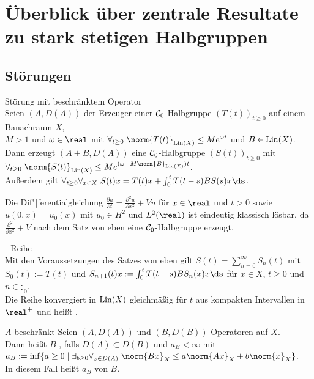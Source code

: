 \chapter{%
    Überblick über zentrale Resultate zu stark stetigen Halbgruppen%
}

\section{%
    Störungen%
}

\begin{Satz}{Störung mit beschränktem Operator}\\
    Seien $(A, D(A))$ der Erzeuger einer $\mathcal{C}_0$-Halbgruppe $(T(t))_{t \ge 0}$ auf einem
    Banachraum $X$,\\
    $M > 1$ und $\omega \in \real$ mit
    $\forall_{t \ge 0}\; \norm{T(t)}_{\Lin(X)} \le Me^{\omega t}$ und $B \in \operatorname{Lin}(X)$.\\
    Dann erzeugt $(A + B, D(A))$ eine $\mathcal{C}_0$-Halbgruppe $(S(t))_{t \ge 0}$ mit\\
    $\forall_{t \ge 0}\; \norm{S(t)}_{\Lin(X)} \le Me^{(\omega + M\norm{B}_{\Lin(X)}) t}$.\\
    Außerdem gilt $\forall_{t \ge 0} \forall_{x \in X}\;
    S(t)x = T(t)x + \int_0^t T(t-s)BS(s)x\ds$.
\end{Satz}

\begin{Bsp}
    Die Dif"|ferentialgleichung
    $\frac{\partial u}{\partial t} = \frac{\partial^2 u}{\partial x^2} + Vu$
    für $x \in \real$ und $t > 0$ sowie $u(0, x) = u_0(x)$ mit $u_0 \in H^2$ und $L^2(\real)$
    ist eindeutig klassisch lösbar, da $\frac{\partial^2}{\partial x^2} + V$ nach dem Satz von
    eben eine $\mathcal{C}_0$-Halbgruppe erzeugt.
\end{Bsp}

\begin{Satz}{--Reihe}\\
    Mit den Voraussetzungen des Satzes von eben gilt
    $S(t) = \sum_{n=0}^\infty S_n(t)$ mit $S_0(t) := T(t)$ und
    $S_{n+1}(t)x := \int_0^t T(t-s)BS_n(x)x\ds$ für $x \in X$, $t \ge 0$ und $n \in \natural_0$.\\
    Die Reihe konvergiert in $\operatorname{Lin}(X)$ gleichmäßig für $t$ aus kompakten Intervallen in $\real^+$
    und heißt .
\end{Satz}

\linie

\begin{Def}{$A$-beschränkt}
    Seien $(A, D(A))$ und $(B, D(B))$ Operatoren auf $X$.\\
    Dann heißt $B$ , falls $D(A) \subset D(B)$ und $a_B < \infty$ mit\\
    $a_B := \inf\{a \ge 0 \;|\; \exists_{b \ge 0} \forall_{x \in D(A)}\;
    \norm{Bx}_X \le a \norm{Ax}_X + b \norm{x}_X\}$.\\
    In diesem Fall heißt $a_B$  von $B$.
\end{Def}

